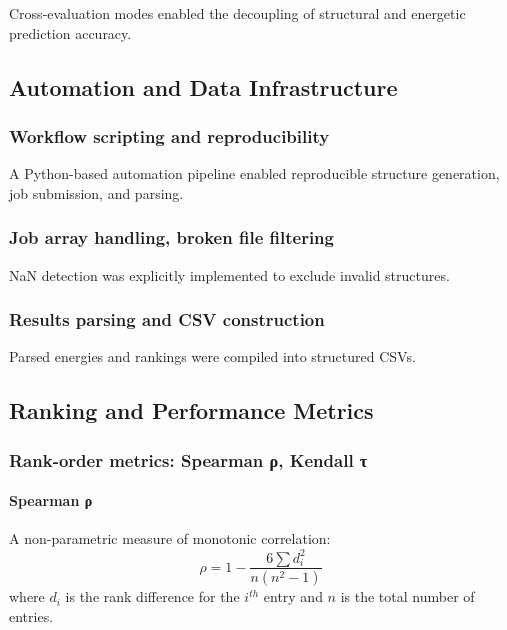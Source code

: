 Cross-evaluation modes enabled the decoupling of structural and energetic prediction accuracy.

\subsection{Automation and Data Infrastructure}

\subsubsection{Workflow scripting and reproducibility}

A Python-based automation pipeline enabled reproducible structure generation, job submission, and parsing.


\subsubsection{Job array handling, broken file filtering}

NaN detection was explicitly implemented to exclude invalid structures.

\subsubsection{Results parsing and CSV construction}

Parsed energies and rankings were compiled into structured CSVs.

\subsection{Ranking and Performance Metrics}

\subsubsection{Rank-order metrics: Spearman ρ, Kendall τ}

\paragraph{Spearman ρ}

A non-parametric measure of monotonic correlation:
\[
\rho = 1 - \frac{6 \sum d_i^2}{n(n^2 - 1)}
\]
where \(d_i\) is the rank difference for the \(i^{th}\) entry and \(n\) is the total number of entries.


